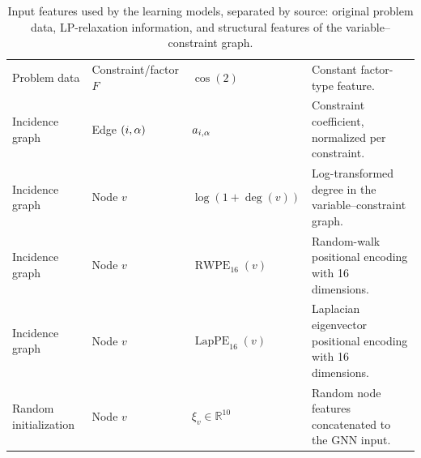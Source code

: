 \begin{table}[htbp]
{\begin{tabular}{llll}
Problem data
& Constraint/factor $F$
& $\cos(2)$
& Constant factor-type feature. \\

Incidence graph
& Edge $(i,\alpha)$
& $a_{i,\alpha}$
& Constraint coefficient, normalized per constraint. \\

Incidence graph
& Node $v$
& $\log(1+\deg(v))$
& Log-transformed degree in the variable--constraint graph. \\

Incidence graph
& Node $v$
& $\operatorname{RWPE}_{16}(v)$
& Random-walk positional encoding with 16 dimensions. \\

Incidence graph
& Node $v$
& $\operatorname{LapPE}_{16}(v)$
& Laplacian eigenvector positional encoding with 16 dimensions. \\

Random initialization
& Node $v$
& $\xi_v \in \mathbb{R}^{10}$
& Random node features concatenated to the GNN input. \\

\bottomrule
\end{tabular}
}

\caption{Input features used by the learning models, separated by source: original problem data, LP-relaxation information, and structural features of the variable--constraint graph.}
\label{tab:dataset_features}
\end{table}